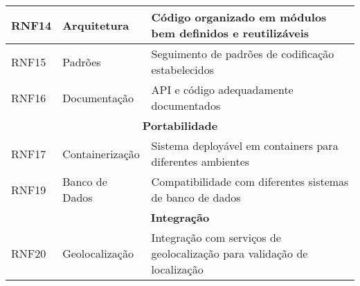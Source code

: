 \begin{table}[!htbp]
\begin{tabular}{|p{}|p{}|p{}|}
\hline
RNF14 & Arquitetura & Código organizado em módulos bem definidos e reutilizáveis \\
\hline
RNF15 & Padrões & Seguimento de padrões de codificação estabelecidos \\
\hline
RNF16 & Documentação & API e código adequadamente documentados \\
\hline
\multicolumn{3}{|c|}{\textbf{Portabilidade}} \\
\hline
RNF17 & Containerização & Sistema deployável em containers para diferentes ambientes \\
\hline
RNF19 & Banco de Dados & Compatibilidade com diferentes sistemas de banco de dados \\
\hline
\multicolumn{3}{|c|}{\textbf{Integração}} \\
\hline
RNF20 & Geolocalização & Integração com serviços de geolocalização para validação de localização \\
\hline
\end{tabular}
\end{table}
